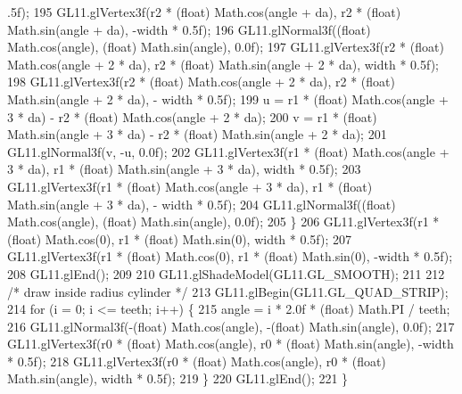 \begin{DoxyCode}
      .5f);
195             GL11.glVertex3f(r2 * (\textcolor{keywordtype}{float}) Math.cos(angle + da), r2 * (float) Math.sin(angle + da), -width * 
      0.5f);
196             GL11.glNormal3f((\textcolor{keywordtype}{float}) Math.cos(angle), (float) Math.sin(angle), 0.0f);
197             GL11.glVertex3f(r2 * (\textcolor{keywordtype}{float}) Math.cos(angle + 2 * da), r2 * (float) Math.sin(angle + 2 * da), 
      width * 0.5f);
198             GL11.glVertex3f(r2 * (\textcolor{keywordtype}{float}) Math.cos(angle + 2 * da), r2 * (float) Math.sin(angle + 2 * da), -
      width * 0.5f);
199             u = r1 * (float) Math.cos(angle + 3 * da) - r2 * (float) Math.cos(angle + 2 * da);
200             v = r1 * (float) Math.sin(angle + 3 * da) - r2 * (float) Math.sin(angle + 2 * da);
201             GL11.glNormal3f(v, -u, 0.0f);
202             GL11.glVertex3f(r1 * (\textcolor{keywordtype}{float}) Math.cos(angle + 3 * da), r1 * (float) Math.sin(angle + 3 * da), 
      width * 0.5f);
203             GL11.glVertex3f(r1 * (\textcolor{keywordtype}{float}) Math.cos(angle + 3 * da), r1 * (float) Math.sin(angle + 3 * da), -
      width * 0.5f);
204             GL11.glNormal3f((\textcolor{keywordtype}{float}) Math.cos(angle), (float) Math.sin(angle), 0.0f);
205         \}
206         GL11.glVertex3f(r1 * (\textcolor{keywordtype}{float}) Math.cos(0), r1 * (float) Math.sin(0), width * 0.5f);
207         GL11.glVertex3f(r1 * (\textcolor{keywordtype}{float}) Math.cos(0), r1 * (float) Math.sin(0), -width * 0.5f);
208         GL11.glEnd();
209 
210         GL11.glShadeModel(GL11.GL\_SMOOTH);
211 
212         \textcolor{comment}{/* draw inside radius cylinder */}
213         GL11.glBegin(GL11.GL\_QUAD\_STRIP);
214         \textcolor{keywordflow}{for} (i = 0; i <= teeth; i++) \{
215             angle = i * 2.0f * (float) Math.PI / teeth;
216             GL11.glNormal3f(-(\textcolor{keywordtype}{float}) Math.cos(angle), -(float) Math.sin(angle), 0.0f);
217             GL11.glVertex3f(r0 * (\textcolor{keywordtype}{float}) Math.cos(angle), r0 * (float) Math.sin(angle), -width * 0.5f);
218             GL11.glVertex3f(r0 * (\textcolor{keywordtype}{float}) Math.cos(angle), r0 * (float) Math.sin(angle), width * 0.5f);
219         \}
220         GL11.glEnd();
221     \}
\end{DoxyCode}
\mbox{\label{classorg_1_1newdawn_1_1slick_1_1tests_1_1_slick_callable_test_a5f54cf637de462ca508811398a0f92ae}} 
